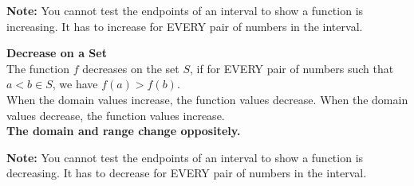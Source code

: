 \documentclass{ximera}
\begin{document}
\textbf{Note:} You cannot test the endpoints of an interval to show a function is increasing.  It has to increase for EVERY pair of numbers in the interval.








\begin{definition} \textbf{\textcolor{green!50!black}{Decrease on a Set}} \\

The function $f$ decreases on the set $S$, if for EVERY pair of numbers such that $a < b \in S$, we have  $f(a) > f(b)$. \\

When the domain values increase, the function values decrease. When the domain values decrease, the function values increase.  \\



\textbf{\textcolor{purple!85!blue}{The domain and range change oppositely.}}



\end{definition}






\textbf{Note:} You cannot test the endpoints of an interval to show a function is decreasing.  It has to decrease for EVERY pair of numbers in the interval. \\
\end{document}
